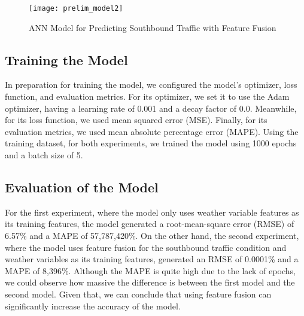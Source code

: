 \begin{figure}[h]
\caption{ANN Model for Predicting Southbound Traffic with Feature Fusion}
\centering
\texttt{[image: prelim\_model2]}
\label{prelim_model2}
\end{figure}


\subsection{Training the Model}
In preparation for training the model, we configured the model’s optimizer, loss function, and evaluation metrics. For its optimizer, we set it to use the Adam optimizer, having a learning rate of 0.001 and a decay factor of 0.0. Meanwhile, for its loss function, we used mean squared error (MSE). Finally, for its evaluation metrics, we used mean absolute percentage error (MAPE). Using the training dataset, for both experiments, we trained the model using 1000 epochs and a batch size of 5. 



\subsection{Evaluation of the Model}
For the first experiment, where the model only uses weather variable features as its training features, the model generated a root-mean-square error (RMSE) of 6.57\% and a MAPE of 57,787,420\%. On the other hand, the second experiment, where the model uses feature fusion for the southbound traffic condition and weather variables as its training features, generated an RMSE of 0.0001\% and a MAPE of 8,396\%. Although the MAPE is quite high due to the lack of epochs, we could observe how massive the difference is between the first model and the second model. Given that, we can conclude that using feature fusion can significantly increase the accuracy of the model.
